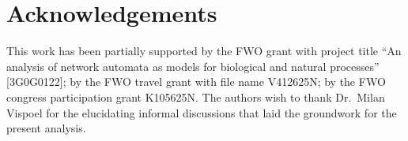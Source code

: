 \documentclass[a4paper,fleqn]{cas-dc}
\begin{document}
\section*{Acknowledgements}
This work has been partially supported by the FWO grant with project title ``An analysis of network automata as models for biological and natural processes'' [3G0G0122]; by the FWO travel grant with file name V412625N; by the FWO congress participation grant K105625N. The authors wish to thank Dr.~Milan Vispoel for the elucidating informal discussions that laid the groundwork for the present analysis.

\printcredits



\end{document}
